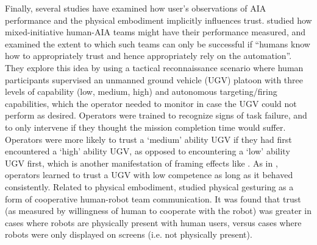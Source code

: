 Finally, several studies have examined how user's observations of AIA performance and the physical embodiment implicitly influences trust. %
\citet{Freedy2007-sg} studied how mixed-initiative human-AIA teams might have their performance measured, and examined the extent to which such teams can only be successful if ``humans know how to appropriately trust and hence appropriately rely on the automation''. 
They explore this idea by using a tactical reconnaissance scenario where human participants supervised an unmanned ground vehicle (UGV)  platoon with three levels of capability (low, medium, high) and autonomous targeting/firing capabilities, which the operator needed to monitor in case the UGV could not perform as desired. \cite{did the operators have to select these capability levels? }
Operators were trained to recognize signs of task failure, and to only intervene if they thought the mission completion time would suffer. %
Operators were more likely to trust a `medium' ability UGV if they had first encountered a `high' ability UGV, as opposed to encountering a `low' ability UGV first, which is another manifestation of framing effects like \cite{Riley1996-qm}. %
As in \cite{Muir1996-gt}, operators learned to trust a UGV with low competence as long as it behaved consistently. 
Related to physical embodiment, \citet{Bainbridge2011-pl} studied physical gesturing as a form of cooperative human-robot team communication.  It was found that trust (as measured by willingness of human to cooperate with the robot) was greater in cases where robots are physically present with human users, versus cases where robots were only displayed on screens (i.e. not physically present). 
